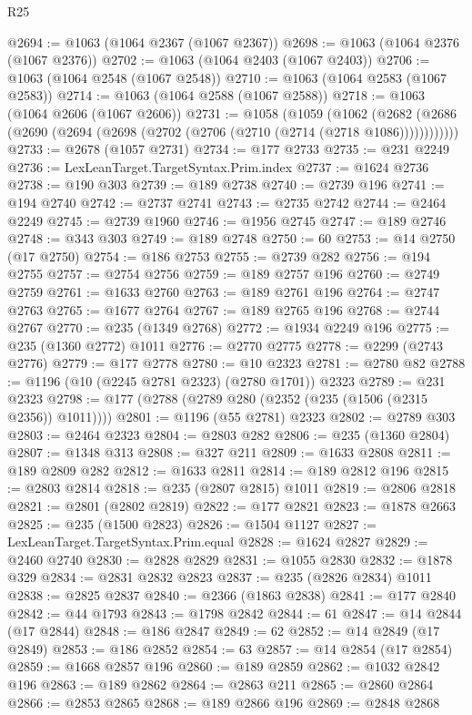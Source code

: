 \begin{lexlean}{R25}
\begin{coremodule}
@2694 := @1063 (@1064 @2367 (@1067 @2367))
@2698 := @1063 (@1064 @2376 (@1067 @2376))
@2702 := @1063 (@1064 @2403 (@1067 @2403))
@2706 := @1063 (@1064 @2548 (@1067 @2548))
@2710 := @1063 (@1064 @2583 (@1067 @2583))
@2714 := @1063 (@1064 @2588 (@1067 @2588))
@2718 := @1063 (@1064 @2606 (@1067 @2606))
@2731 := @1058
    (@1059
      (@1062 (@2682 (@2686 (@2690 (@2694 (@2698 (@2702 (@2706 (@2710 (@2714 (@2718 @1086))))))))))))
@2733 := @2678 (@1057 @2731)
@2734 := @177 @2733
@2735 := @231 @2249
@2736 := LexLeanTarget.TargetSyntax.Prim.index
@2737 := @1624 @2736
@2738 := @190 @303
@2739 := @189 @2738
@2740 := @2739 @196
@2741 := @194 @2740
@2742 := @2737 @2741
@2743 := @2735 @2742
@2744 := @2464 @2249
@2745 := @2739 @1960
@2746 := @1956 @2745
@2747 := @189 @2746
@2748 := @343 @303
@2749 := @189 @2748
@2750 := 60
@2753 := @14 @2750 (@17 @2750)
@2754 := @186 @2753
@2755 := @2739 @282
@2756 := @194 @2755
@2757 := @2754 @2756
@2759 := @189 @2757 @196
@2760 := @2749 @2759
@2761 := @1633 @2760
@2763 := @189 @2761 @196
@2764 := @2747 @2763
@2765 := @1677 @2764
@2767 := @189 @2765 @196
@2768 := @2744 @2767
@2770 := @235 (@1349 @2768)
@2772 := @1934 @2249 @196
@2775 := @235 (@1360 @2772) @1011
@2776 := @2770 @2775
@2778 := @2299 (@2743 @2776)
@2779 := @177 @2778
@2780 := @10 @2323
@2781 := @2780 @82
@2788 := @1196 (@10 (@2245 @2781 @2323) (@2780 @1701)) @2323
@2789 := @231 @2323
@2798 := @177 (@2788 (@2789 @280 (@2352 (@235 (@1506 (@2315 @2356)) @1011))))
@2801 := @1196 (@55 @2781) @2323
@2802 := @2789 @303
@2803 := @2464 @2323
@2804 := @2803 @282
@2806 := @235 (@1360 @2804)
@2807 := @1348 @313
@2808 := @327 @211
@2809 := @1633 @2808
@2811 := @189 @2809 @282
@2812 := @1633 @2811
@2814 := @189 @2812 @196
@2815 := @2803 @2814
@2818 := @235 (@2807 @2815) @1011
@2819 := @2806 @2818
@2821 := @2801 (@2802 @2819)
@2822 := @177 @2821
@2823 := @1878 @2663
@2825 := @235 (@1500 @2823)
@2826 := @1504 @1127
@2827 := LexLeanTarget.TargetSyntax.Prim.equal
@2828 := @1624 @2827
@2829 := @2460 @2740
@2830 := @2828 @2829
@2831 := @1055 @2830
@2832 := @1878 @329
@2834 := @2831 @2832 @2823
@2837 := @235 (@2826 @2834) @1011
@2838 := @2825 @2837
@2840 := @2366 (@1863 @2838)
@2841 := @177 @2840
@2842 := @44 @1793
@2843 := @1798 @2842
@2844 := 61
@2847 := @14 @2844 (@17 @2844)
@2848 := @186 @2847
@2849 := 62
@2852 := @14 @2849 (@17 @2849)
@2853 := @186 @2852
@2854 := 63
@2857 := @14 @2854 (@17 @2854)
@2859 := @1668 @2857 @196
@2860 := @189 @2859
@2862 := @1032 @2842 @196
@2863 := @189 @2862
@2864 := @2863 @211
@2865 := @2860 @2864
@2866 := @2853 @2865
@2868 := @189 @2866 @196
@2869 := @2848 @2868

\end{coremodule}
\end{lexlean}
